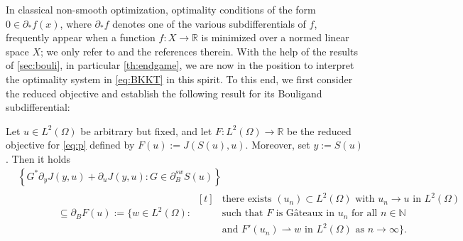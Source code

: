 \documentclass[reqno]{shinyart}
\begin{document}
In classical non-smooth optimization, optimality conditions of the form $0\in \partial_* f(x)$, where  $\partial_* f$ denotes one of the various subdifferentials of $f$,
frequently appear when a function $f: X \to {\mathbb{R}}$ is minimized over a normed linear space $X$;  
we only refer to \cite[Secs.~7 and 9]{schirotzek} and the references therein.
With the help of the results of \cref{sec:bouli}, in particular \cref{th:endgame}, we
are now in the position to interpret the optimality system in \eqref{eq:BKKT} in this spirit. 
To this end, we first consider the reduced objective and establish the following result 
for its Bouligand subdifferential:
\begin{proposition}\label{prop:chainrule}
    Let $u \in L^2(\Omega)$ be arbitrary but fixed, 
    and let $F : L^2(\Omega) \to {\mathbb{R}}$ be the reduced objective for \eqref{eq:p} defined by $F(u) := J(S(u), u)$. 
    Moreover, set $y:=S(u)$. Then it holds
    \begin{equation*}
        \begin{aligned}
            &\left\{ G^*\partial_y J(y, u) + \partial_u J( y, u)  :  G \in  \partial_B^{sw} S(u)\right\} \\
            &\qquad\qquad \subseteq  \partial_B F(u) := \{ w \in L^2(\Omega):\, 
            \begin{aligned}[t]
                & \text{there exists } (u_n) \subset L^2(\Omega) \text{ with } u_n \to u\text{ in } L^2(\Omega) \\
                & \text{such that } F \text{ is G\^ateaux in } u_n \text{ for all } n \in {\mathbb{N}} \\
                & \text{and }F'(u_n) \rightharpoonup w \text{ in } L^2(\Omega) \text{ as }n\to \infty\}.
            \end{aligned}    
        \end{aligned}
    \end{equation*}
\end{proposition}
\end{document}
